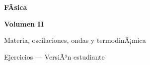 ﻿\documentclass[11pt,letterpaper,openany]{book}
\newcommand{\rutaraiz}{../..}
\newcommand{\numerovolumen}{II}
\newcommand{\nombrevolumen}{Materia, oscilaciones, ondas y termodinÃ¡mica}
\begin{document}

\begin{titlepage}

    \centering

    \vspace*{2.5cm}

    {\color{RojoPrincipal}
    \Huge\bfseries
    FÃ­sica
    \par}

    \vspace{0.8cm}

    {\color{AzulPrincipal}
    \LARGE\bfseries
    Volumen \numerovolumen
    \par}

    \vspace{0.5cm}

    {\Large
    \nombrevolumen
    \par}

    \vspace{1.5cm}

    {\color{AzulPrincipal}
    \Large
    Ejercicios --- VersiÃ³n estudiante
    \par}

    \vfill

    {\Large\bfseries
    \autorlibro
    \par}

    \vspace{2cm}

\end{titlepage}



\frontmatter

\tableofcontents

\cleardoublepage



\mainmatter

%
%
%
%
%
%
%
%
% 
\end{document}
